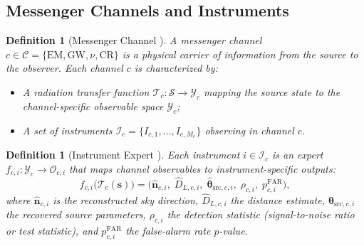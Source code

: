 \documentclass[11pt,a4paper]{article}
\newtheorem{definition}[theorem]{Definition}
\theoremstyle{definition}
\newcommand{\cY}{\mathcal{Y}}
\newcommand{\cO}{\mathcal{O}}
\newcommand{\cS}{\mathcal{S}}
\begin{document}
\subsection{Messenger Channels and Instruments}
\begin{definition}[Messenger Channel ]\label{def:messenger_channel}
A messenger channel $c \in \mathcal{C} = \{\mathrm{EM}, \mathrm{GW}, \nu, \mathrm{CR}\}$ is a physical carrier of information from the source to the observer. Each channel $c$ is characterized by:
\begin{itemize}
    \item A radiation transfer function $\mathcal{T}_c: \cS \to \cY_c$ mapping the source state to the channel-specific observable space $\cY_c$;
    \item A set of instruments $\mathcal{I}_c = \{I_{c,1}, \ldots, I_{c, M_c}\}$ observing in channel $c$.
\end{itemize}
\end{definition}
\begin{definition}[Instrument Expert ]\label{def:instrument_expert}
Each instrument $i \in \mathcal{I}_c$ is an expert $f_{c,i}: \cY_c \to \cO_{c,i}$ that maps channel observables to instrument-specific outputs:
\begin{equation}\label{eq:instrument}
f_{c,i}\bigl(\mathcal{T}_c(\mathbf{s})\bigr) = \bigl( \hat{\mathbf{n}}_{c,i}, \; \hat{D}_{L, c,i}, \; \hat{\boldsymbol{\theta}}_{\mathrm{src}, c,i}, \; \rho_{c,i}, \; p_{c,i}^{\mathrm{FAR}} \bigr),
\end{equation}
where $\hat{\mathbf{n}}_{c,i}$ is the reconstructed sky direction, $\hat{D}_{L, c,i}$ the distance estimate, $\hat{\boldsymbol{\theta}}_{\mathrm{src}, c,i}$ the recovered source parameters, $\rho_{c,i}$ the detection statistic (signal-to-noise ratio or test statistic), and $p_{c,i}^{\mathrm{FAR}}$ the false-alarm rate $p$-value.
\end{definition}
\end{document}
